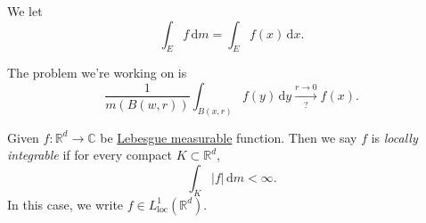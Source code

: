 \begin{notation}
	We let
	\[
		\int _E f \,\mathrm{d} m = \int _E f(x) \,\mathrm{d} x.
	\]
\end{notation}

The problem we're working on is
\[
	\frac{1}{m(B(w, r))}\int _{B(x, r)}f(y)\,\mathrm{d} y \overset{r\to 0}{\underset{?}{\longrightarrow}}f(x).
\]
\begin{definition}\label{def:locally-integrable}
	Given \(f\colon \mathbb{R} ^d \to \mathbb{C} \) be \hyperref[def:Lebesgue-measurable-function]{Lebesgue measurable}
	function. Then we say \(f\) is \emph{locally integrable} if for every compact \(K\subset \mathbb{R} ^d\),
	\[
		\int _K \left\vert f \right\vert \,\mathrm{d} m < \infty.
	\]
	In this case, we write \(f\in L^1_{\text{loc} }(\mathbb{R} ^d)\).
\end{definition}

